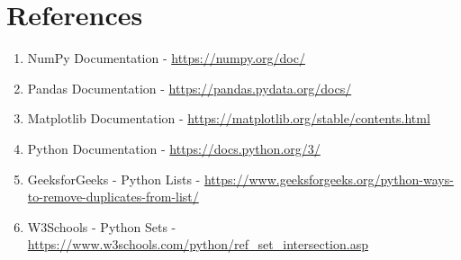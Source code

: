 \documentclass[12pt]{article}
\begin{document}
\section{References}
\begin{enumerate}
    \item NumPy Documentation - \url{https://numpy.org/doc/}
    \item Pandas Documentation - \url{https://pandas.pydata.org/docs/}
    \item Matplotlib Documentation - \url{https://matplotlib.org/stable/contents.html}
    \item Python Documentation - \url{https://docs.python.org/3/}
    \item GeeksforGeeks - Python Lists - \url{https://www.geeksforgeeks.org/python-ways-to-remove-duplicates-from-list/}
    \item W3Schools - Python Sets - \url{https://www.w3schools.com/python/ref_set_intersection.asp}
\end{enumerate}
\end{document}

